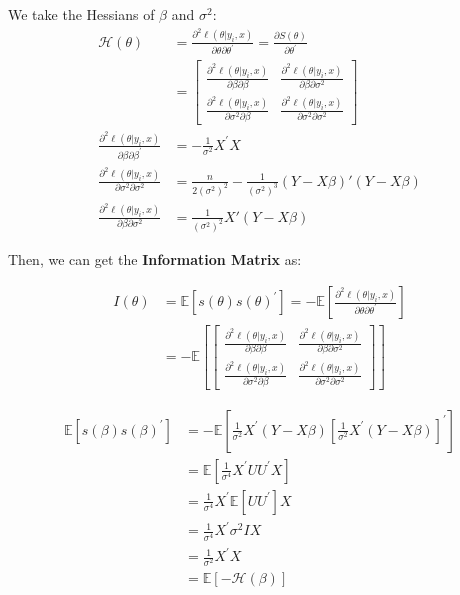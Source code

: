 We take the Hessians of $\beta$ and $\sigma^2$:
\begin{align*}
    \mathcal{H} (\theta ) &= \frac{\partial^2 \ell(\theta |y_i, x)}{\partial \theta \partial \theta ^{\prime}} = \frac{\partial S(\theta )}{\partial \theta^{\prime}}\\
    &= \begin{bmatrix}
        \frac{\partial^2 \ell(\theta |y_i, x)}{\partial \beta \partial \beta} & \frac{\partial^2 \ell(\theta |y_i, x)}{\partial \beta \partial \sigma^2}\\
        \frac{\partial^2 \ell(\theta |y_i, x)}{\partial \sigma^2 \partial \beta} & \frac{\partial^2 \ell(\theta |y_i, x)}{\partial \sigma^2 \partial \sigma^2}
    \end{bmatrix}\\
    \frac{\partial^2 \ell(\theta |y_i, x)}{\partial \beta \partial \beta^{\prime} } &= -\frac{1}{\sigma^2}X^{\prime} X\\
    \frac{\partial^2 \ell(\theta |y_i, x)}{\partial \sigma^2 \partial \sigma^2} &= \frac{n}{2(\sigma^2)^2} - \frac{1}{(\sigma^2)^3} (Y - X\beta )'(Y - X\beta )\\
    \frac{\partial^2 \ell(\theta |y_i, x)}{\partial \beta \partial \sigma^2} &= \frac{1}{(\sigma^2)^2}X'(Y - X\beta )
\end{align*}

    
Then, we can get the \textbf{Information Matrix} as: 
\begin{definition}
    \begin{align*}
        I(\theta ) &= \mathbb{E}[s(\theta )s(\theta )^{\prime}] =  -\mathbb{E}\left[\frac{\partial^2 \ell(\theta |y_i, x)}{\partial \theta \partial \theta ^{\prime}}\right]\\
        &= -\mathbb{E}\left[\begin{bmatrix}
            \frac{\partial^2 \ell(\theta |y_i, x)}{\partial \beta \partial \beta } & \frac{\partial^2 \ell(\theta |y_i, x)}{\partial \beta \partial \sigma^2}\\
            \frac{\partial^2 \ell(\theta |y_i, x)}{\partial \sigma^2 \partial \beta} & \frac{\partial^2 \ell(\theta |y_i, x)}{\partial \sigma^2 \partial \sigma^2}
        \end{bmatrix}\right]
    \end{align*}
\end{definition}

\begin{align*}
    \mathbb{E}[s(\beta )s(\beta )^{\prime} ] &= -\mathbb{E}\left[ \frac{1}{\sigma ^2}X^{\prime}(Y - X\beta)\left[\frac{1}{\sigma^2} X^{\prime} (Y-X\beta) \right]^{\prime} \right]\\
    &= \mathbb{E}\left[\frac{1}{\sigma^4}X^{\prime}U U^{\prime} X\right]\\
    &= \frac{1}{\sigma^4}X^{\prime} \mathbb{E}[U U^{\prime}] X\\
    &= \frac{1}{\sigma^4}X^{\prime} \sigma^2 I X\\
    &= \frac{1}{\sigma^2}X^{\prime}X \\
    &= \mathbb{E}[-\mathcal{H}(\beta )]
\end{align*}


